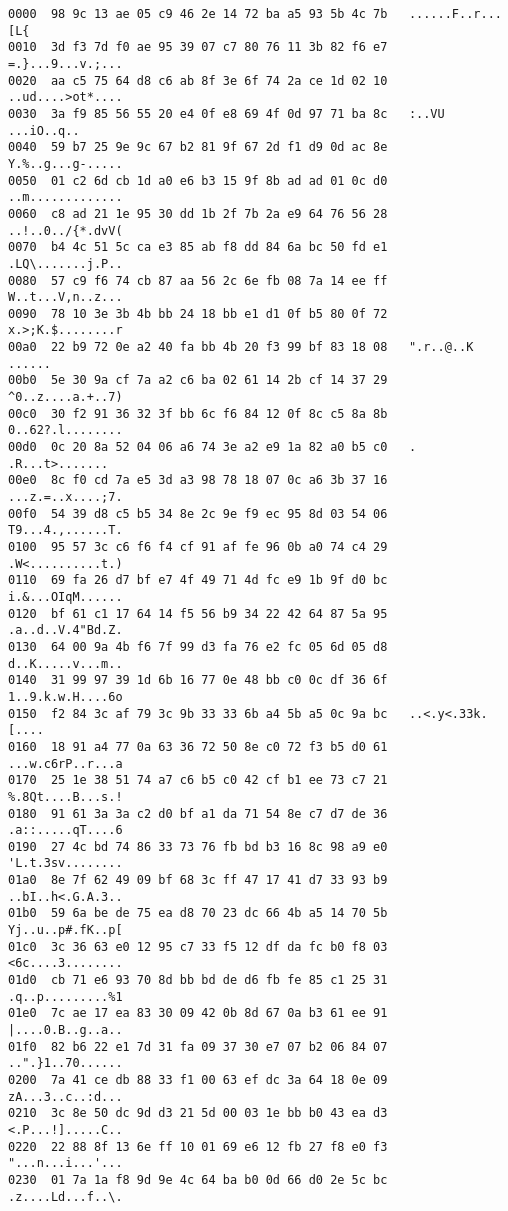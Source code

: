 \begin{lstlisting}
0000  98 9c 13 ae 05 c9 46 2e 14 72 ba a5 93 5b 4c 7b   ......F..r...[L{
0010  3d f3 7d f0 ae 95 39 07 c7 80 76 11 3b 82 f6 e7   =.}...9...v.;...
0020  aa c5 75 64 d8 c6 ab 8f 3e 6f 74 2a ce 1d 02 10   ..ud....>ot*....
0030  3a f9 85 56 55 20 e4 0f e8 69 4f 0d 97 71 ba 8c   :..VU ...iO..q..
0040  59 b7 25 9e 9c 67 b2 81 9f 67 2d f1 d9 0d ac 8e   Y.%..g...g-.....
0050  01 c2 6d cb 1d a0 e6 b3 15 9f 8b ad ad 01 0c d0   ..m.............
0060  c8 ad 21 1e 95 30 dd 1b 2f 7b 2a e9 64 76 56 28   ..!..0../{*.dvV(
0070  b4 4c 51 5c ca e3 85 ab f8 dd 84 6a bc 50 fd e1   .LQ\.......j.P..
0080  57 c9 f6 74 cb 87 aa 56 2c 6e fb 08 7a 14 ee ff   W..t...V,n..z...
0090  78 10 3e 3b 4b bb 24 18 bb e1 d1 0f b5 80 0f 72   x.>;K.$........r
00a0  22 b9 72 0e a2 40 fa bb 4b 20 f3 99 bf 83 18 08   ".r..@..K ......
00b0  5e 30 9a cf 7a a2 c6 ba 02 61 14 2b cf 14 37 29   ^0..z....a.+..7)
00c0  30 f2 91 36 32 3f bb 6c f6 84 12 0f 8c c5 8a 8b   0..62?.l........
00d0  0c 20 8a 52 04 06 a6 74 3e a2 e9 1a 82 a0 b5 c0   . .R...t>.......
00e0  8c f0 cd 7a e5 3d a3 98 78 18 07 0c a6 3b 37 16   ...z.=..x....;7.
00f0  54 39 d8 c5 b5 34 8e 2c 9e f9 ec 95 8d 03 54 06   T9...4.,......T.
0100  95 57 3c c6 f6 f4 cf 91 af fe 96 0b a0 74 c4 29   .W<..........t.)
0110  69 fa 26 d7 bf e7 4f 49 71 4d fc e9 1b 9f d0 bc   i.&...OIqM......
0120  bf 61 c1 17 64 14 f5 56 b9 34 22 42 64 87 5a 95   .a..d..V.4"Bd.Z.
0130  64 00 9a 4b f6 7f 99 d3 fa 76 e2 fc 05 6d 05 d8   d..K.....v...m..
0140  31 99 97 39 1d 6b 16 77 0e 48 bb c0 0c df 36 6f   1..9.k.w.H....6o
0150  f2 84 3c af 79 3c 9b 33 33 6b a4 5b a5 0c 9a bc   ..<.y<.33k.[....
0160  18 91 a4 77 0a 63 36 72 50 8e c0 72 f3 b5 d0 61   ...w.c6rP..r...a
0170  25 1e 38 51 74 a7 c6 b5 c0 42 cf b1 ee 73 c7 21   %.8Qt....B...s.!
0180  91 61 3a 3a c2 d0 bf a1 da 71 54 8e c7 d7 de 36   .a::.....qT....6
0190  27 4c bd 74 86 33 73 76 fb bd b3 16 8c 98 a9 e0   'L.t.3sv........
01a0  8e 7f 62 49 09 bf 68 3c ff 47 17 41 d7 33 93 b9   ..bI..h<.G.A.3..
01b0  59 6a be de 75 ea d8 70 23 dc 66 4b a5 14 70 5b   Yj..u..p#.fK..p[
01c0  3c 36 63 e0 12 95 c7 33 f5 12 df da fc b0 f8 03   <6c....3........
01d0  cb 71 e6 93 70 8d bb bd de d6 fb fe 85 c1 25 31   .q..p.........%1
01e0  7c ae 17 ea 83 30 09 42 0b 8d 67 0a b3 61 ee 91   |....0.B..g..a..
01f0  82 b6 22 e1 7d 31 fa 09 37 30 e7 07 b2 06 84 07   ..".}1..70......
0200  7a 41 ce db 88 33 f1 00 63 ef dc 3a 64 18 0e 09   zA...3..c..:d...
0210  3c 8e 50 dc 9d d3 21 5d 00 03 1e bb b0 43 ea d3   <.P...!].....C..
0220  22 88 8f 13 6e ff 10 01 69 e6 12 fb 27 f8 e0 f3   "...n...i...'...
0230  01 7a 1a f8 9d 9e 4c 64 ba b0 0d 66 d0 2e 5c bc   .z....Ld...f..\.

\end{lstlisting}
